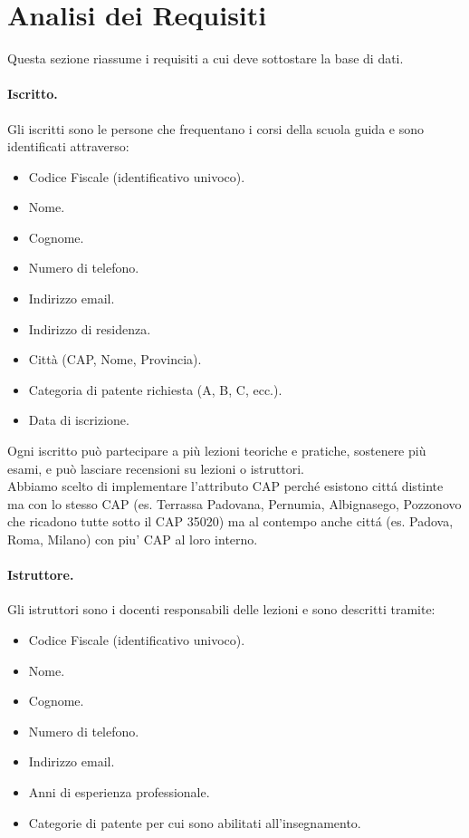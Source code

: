 \documentclass[10pt,twoside]{article}
\begin{document}
\section{Analisi dei Requisiti}{
    \label{sec:analisiRequisiti}
    Questa sezione riassume i requisiti a cui deve sottostare la base di dati.

    \paragraph{Iscritto.}
    Gli iscritti sono le persone che frequentano i corsi della scuola guida e sono identificati attraverso:

    \begin{itemize}
        \item Codice Fiscale (identificativo univoco).
        \item Nome.
        \item Cognome.
        \item Numero di telefono.
        \item Indirizzo email.
        \item Indirizzo di residenza.
        \item Città (CAP, Nome, Provincia). 
        \item Categoria di patente richiesta (A, B, C, ecc.).
        \item Data di iscrizione.
    \end{itemize}
    
    Ogni iscritto può partecipare a più lezioni teoriche e pratiche, sostenere più esami, e può lasciare recensioni su lezioni o istruttori. \\
    Abbiamo scelto di implementare l'attributo CAP perché esistono cittá distinte ma con lo stesso CAP (es. Terrassa Padovana, Pernumia, Albignasego, Pozzonovo che ricadono tutte sotto il CAP 35020) ma al contempo anche cittá (es. Padova, Roma, Milano) con piu' CAP al loro interno.
    

    \paragraph{Istruttore.}
    Gli istruttori sono i docenti responsabili delle lezioni e sono descritti tramite:
    
    \begin{itemize}
        \item Codice Fiscale (identificativo univoco).
        \item Nome.
        \item Cognome.
        \item Numero di telefono.
        \item Indirizzo email.
        \item Anni di esperienza professionale.
        \item Categorie di patente per cui sono abilitati all’insegnamento.
    \end{itemize}

}
\end{document}
